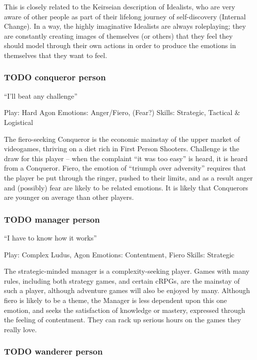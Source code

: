 \documentclass[11pt]{article}
\begin{document}
This is closely related to the Keirseian description of Idealists,
who are very aware of other people as part of their lifelong journey
of self-discovery (Internal Change). In a way, the highly imaginative
Idealists are always roleplaying; they are constantly creating images
of themselves (or others) that they feel they should model through
their own actions in order to produce the emotions in themselves that
they want to feel.
\subsubsection{{\bfseries\sffamily TODO} conqueror person}
\label{sec-2-2-12}

“I’ll beat any challenge”

Play: Hard Agon
Emotions: Anger/Fiero, (Fear?)
Skills: Strategic, Tactical \& Logistical 

The fiero-seeking Conqueror is the economic mainstay of the upper
market of videogames, thriving on a diet rich in First
Person Shooters. Challenge is the draw for this player – when the
complaint “it was too easy” is heard, it is heard from a
Conqueror. Fiero, the emotion of “triumph over adversity” requires
that the player be put through the ringer, pushed to their limits,
and as a result anger and (possibly) fear are likely to be
related emotions. It is likely that Conquerors are younger on average
than other players.
\subsubsection{{\bfseries\sffamily TODO} manager person}
\label{sec-2-2-13}

“I have to know how it works”

Play: Complex Ludus, Agon
Emotions: Contentment, Fiero
Skills: Strategic 

The strategic-minded manager is a complexity-seeking player. Games
with many rules, including both strategy games, and certain cRPGs,
are the mainstay of such a player, although adventure games will also
be enjoyed by many. Although fiero is likely to be a theme, the
Manager is less dependent upon this one emotion, and seeks the
satisfaction of knowledge or mastery, expressed through the feeling
of contentment. They can rack up serious hours on the games they
really love.


\subsubsection{{\bfseries\sffamily TODO} wanderer person}
\label{sec-2-2-14}
\end{document}
